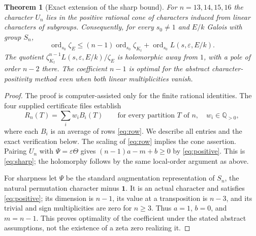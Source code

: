 \documentclass[11pt]{article}
\newtheorem{theorem}{Theorem}[section]
\theoremstyle{remark}\newtheorem{remark}[theorem]{Remark}
\newcommand{\ord}{\operatorname{ord}}
\newcommand{\Q}{\mathbb Q}
\newcommand{\one}{\mathbf{1}}
\newcommand{\sgn}{\varepsilon}
\begin{document}
\begin{theorem}[Exact extension of the sharp bound]\label{thm:sharp}
For $n=13,14,15,16$ the character $U_n$ lies in the positive rational cone of characters induced from linear characters of subgroups. Consequently, for every $s_0\ne1$ and $E/k$ Galois with group $S_n$,
\begin{equation}\label{eq:sharp}
 \ord_{s_0}\zeta_E\le(n-1)\ord_{s_0}\zeta_{K_t}+\ord_{s_0} L(s,\sgn,E/k).
\end{equation}
The quotient $\zeta_{K_t}^{n-1}L(s,\sgn,E/k)/\zeta_E$ is holomorphic away from $1$, with a pole of order $n-2$ there. The coefficient $n-1$ is optimal for the abstract character-positivity method even when both linear multiplicities vanish.
\end{theorem}
\begin{proof}
The proof is computer-assisted only for the finite rational identities. The four supplied certificate files establish
\begin{equation}\label{eq:certificate}
 R_n(T)=\sum_i w_i B_i(T)\qquad\text{for every partition $T$ of $n$},\quad w_i\in\Q_{>0},
\end{equation}
where each $B_i$ is an average of rows \eqref{eq:row}. We describe all entries and the exact verification below. The scaling of \eqref{eq:row} implies the cone assertion. Pairing $U_n$ with $\Psi=\sgn\Theta$ gives $(n-1)a-m+b\ge0$ by \eqref{eq:positive}. This is \eqref{eq:sharp}; the holomorphy follows by the same local-order argument as above.

For sharpness let $\Psi$ be the standard augmentation representation of $S_n$, the natural permutation character minus $\one$. It is an actual character and satisfies \eqref{eq:positive}; its dimension is $n-1$, its value at a transposition is $n-3$, and its trivial and sign multiplicities are zero for $n\ge3$. Thus $a=1$, $b=0$, and $m=n-1$. This proves optimality of the coefficient under the stated abstract assumptions, not the existence of a zeta zero realizing it.
\end{proof}
\end{document}
